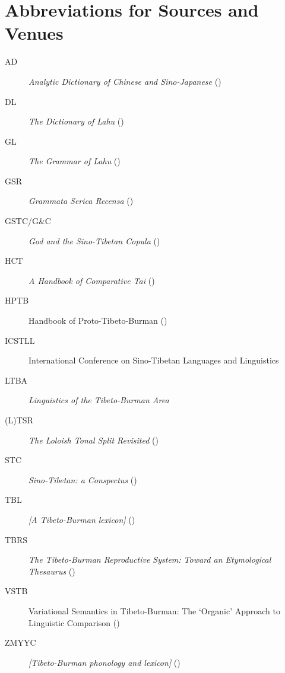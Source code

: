 \section*{Abbreviations for Sources and Venues}
\begin{multicols}{2}
\begin{description}
\item[AD] \textit{Analytic Dictionary of Chinese and Sino-Japanese} (\citealt{BK-AD})
\item[DL] \textit{The Dictionary of Lahu} (\citealt{JAM-DL})
\item[GL] \textit{The Grammar of Lahu} (\citealt{JAM-GL})
\item[GSR] \textit{Grammata Serica Recensa} (\citealt{GSR})
\item[GSTC/G\&C] \textit{God and the Sino-Tibetan Copula} (\citealt{JAM-GSTC})
\item[HCT] \textit{A Handbook of Comparative Tai} (\citealt{LI1977})
\item[HPTB] Handbook of Proto-Tibeto-Burman (\citealt{JAM-HPTB})
\item[ICSTLL] International Conference on Sino-Tibetan Languages and Linguistics
\item[LTBA] \textit{Linguistics of the Tibeto-Burman Area}
\item[(L)TSR] \textit{The Loloish Tonal Split Revisited} (\citealt{JAM-TSR})
\item[STC] \textit{Sino-Tibetan: a Conspectus} (\citealt{STC})
\item[TBL]   \textit{[A Tibeto-Burman lexicon]} (\citealt{TBL})
\item[TBRS] \textit{The Tibeto-Burman Reproductive System: Toward an Etymological Thesaurus} (\citealt{JAM-TBRS})
\item[VSTB] Variational Semantics in Tibeto-Burman: The ‘Organic’ Approach to Linguistic Comparison (\citealt{JAM-VSTB})
\item[ZMYYC]  \textit{[Tibeto-Burman phonology and lexicon]} (\citealt{ZMYYC})
\end{description}
\end{multicols}

